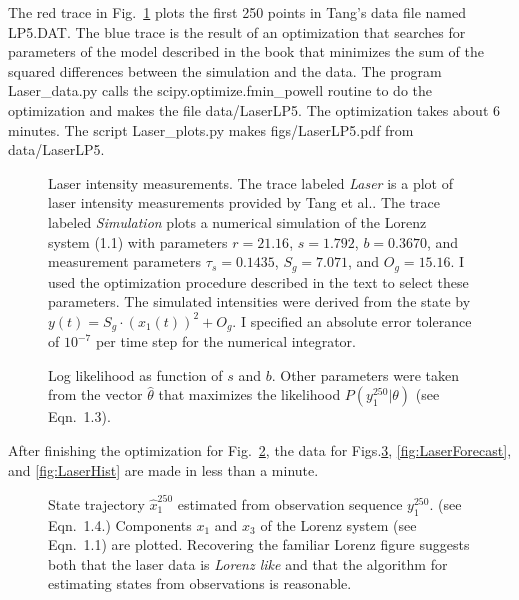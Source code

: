 \documentclass[prelim,showlabels]{book}
\newcommand{\Tsamp}{\tau_s }
\newcommand{\ti}[2]{{#1}{(#2)}}                  %
\newcommand{\ts}[3]{#1_{#2}^{#3}}                    %
\newcommand{\etal}{et al.\xspace}
\begin{document}
The red trace in Fig.~\ref{fig:LaserLP5} plots the first 250 points in
Tang's data file named LP5.DAT.  The blue trace is the result of an
optimization that searches for parameters of the model described in
the book that minimizes the sum of the squared differences between the
simulation and the data.  The program Laser\_data.py calls the
scipy.optimize.fmin\_powell routine to do the optimization and makes
the file data/LaserLP5.  The optimization takes about 6 minutes.  The
script Laser\_plots.py makes figs/LaserLP5.pdf from data/LaserLP5.
\begin{figure}[htbp]
  \caption[Laser intensity measurements.]%
  {Laser intensity measurements.  The trace labeled \emph{Laser} is a
    plot of laser intensity measurements provided by Tang \etal.  The
    trace labeled \emph{Simulation} plots a numerical simulation of
    the Lorenz system (1.1) with parameters $r=21.16$,
    $s=1.792$, $b=0.3670$, and measurement parameters $\Tsamp=0.1435$,
    $S_g = 7.071$, and $O_g =15.16$.  I used the optimization
    procedure described in the text to select these parameters.  The
    simulated intensities were derived from the state by $\ti{y}{t} =
    S_g \cdot (\ti{x_1}{t})^2 + O_g$.  I specified an absolute error
    tolerance of $10^{-7}$ per time step for the numerical
    integrator.}
  \label{fig:LaserLP5}
\end{figure}

\begin{figure}[htbp]
  \caption{Log likelihood as function of $s$ and $b$.  Other parameters were
    taken from the vector $\hat \theta$ that maximizes the likelihood
    $P(\ts{y}{1}{250}|\theta)$ (see Eqn.~1.3).}
  \label{fig:LaserLogLike}
\end{figure}

After finishing the optimization for Fig.~\ref{fig:LaserLogLike}, the
data for Figs.\ref{fig:LaserStates}, \ref{fig:LaserForecast}, and
\ref{fig:LaserHist} are made in less than a minute.
\begin{figure}[htbp]
  \caption[State trajectory $\ts{\hat
    x}{1}{250}$.]%
  {State trajectory $\ts{\hat x}{1}{250}$ estimated from observation
    sequence $\ts{y}{1}{250}$. (see Eqn.~1.4.)
    Components $x_1$ and $x_3$ of the Lorenz system (see
    Eqn.~1.1) are plotted.  Recovering the familiar
    Lorenz figure suggests both that the laser data is \emph{Lorenz
      like} and that the algorithm for estimating states from
    observations is reasonable.}
  \label{fig:LaserStates}
\end{figure}
\end{document}

